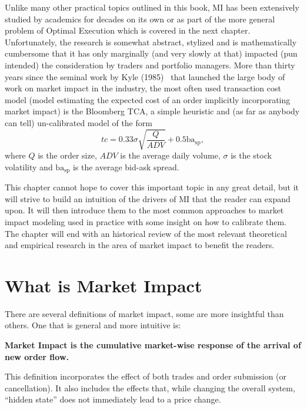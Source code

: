 Unlike many other practical topics outlined in this book, MI has been extensively studied by academics for decades on its own or as part of the more general problem of Optimal Execution which is covered in the next chapter. Unfortunately, the research is somewhat abstract, stylized and is mathematically cumbersome that it has only marginally (and very slowly at that) impacted (pun intended) the consideration by traders and portfolio managers. More than thirty years since the seminal work by Kyle (1985)~\cite{kyle1985} that launched the large body of work on market impact in the industry, the most often used transaction cost model (model estimating the expected cost of an order implicitly incorporating market impact) is the Bloomberg TCA, a simple heuristic and (as far as anybody can tell) un-calibrated model of the form
        \begin{equation}\label{eq:bb_tca}
        tc = 0.33\sigma\sqrt{\frac{Q}{ADV}} + 0.5 \text{ba}_{\text{sp}},
        \end{equation}
where $Q$ is the order size, $ADV$ is the average daily volume, $\sigma$ is the stock volatility and $\text{ba}_{\text{sp}}$ is the average bid-ask spread. 


This chapter cannot hope to cover this important topic in any great detail, but it will strive to build an intuition of the drivers of MI that the reader can expand upon. It will then introduce them to the most common approaches to market impact modeling used in practice with some insight on how to calibrate them. The chapter will end with an historical review of the most relevant theoretical and empirical research in the area of market impact to benefit the readers. 



\section{What is Market Impact}

There are several definitions of market impact, some are more insightful than others. One that is general and more intuitive is:
        \begin{displayquote}
        \textbf{Market Impact is the cumulative market-wise response of the arrival  of new order flow.}
        \end{displayquote}


This definition incorporates the effect of both trades and order submission (or cancellation). It also includes the effects that, while changing the overall system, ``hidden state'' does not immediately lead to a price change.


